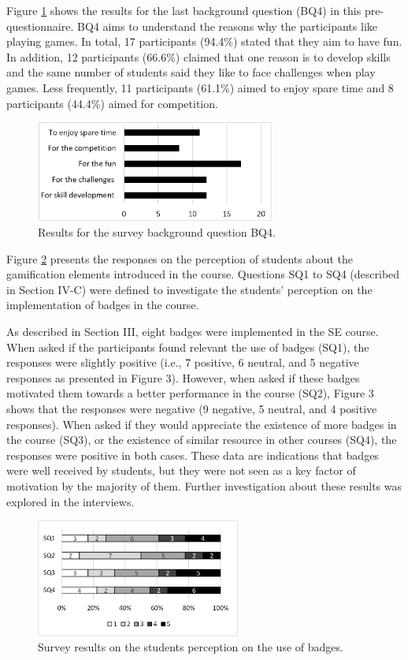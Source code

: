 Figure \ref{fig:gamificationbq4} shows the results for the last background question (BQ4) in this pre-questionnaire. BQ4 aims to understand the reasons why the participants like playing games. In total, 17 participants (94.4\%) stated that they aim to have fun. In addition, 12 participants (66.6\%) claimed that one reason is to develop skills and the same number of students said they like to face challenges when play games. Less frequently, 11 participants (61.1\%) aimed to enjoy spare time and 8 participants (44.4\%) aimed for competition.

\begin{figure}[!h]%
\centering
\includegraphics[width = 0.7\textwidth]{img/gamificationBQ4.png}
\caption{Results for the survey background question BQ4.}
\label{fig:gamificationbq4}
\end{figure}

Figure \ref{fig:gamificationsq14} presents the responses on the perception of students about the gamification elements introduced in the course. Questions SQ1 to SQ4 (described in Section IV-C) were defined to investigate the students’ perception on the implementation of badges in the course. 

As described in Section III, eight badges were implemented in the SE course. When asked if the participants found relevant the use of badges (SQ1), the responses were slightly positive (i.e., 7 positive, 6 neutral, and 5 negative responses as presented in Figure 3). However, when asked if these badges motivated them towards a better performance in the course (SQ2), Figure 3 shows that the responses were negative (9 negative, 5 neutral, and 4 positive responses). When asked if they would appreciate the existence of more badges in the course (SQ3), or the existence of similar resource in other courses (SQ4), the responses were positive in both cases. These data are indications that badges were well received by students, but they were not seen as a key factor of motivation by the majority of them. Further investigation about these results was explored in the interviews.

\begin{figure}[!h]%
\centering
\includegraphics[width = 0.6\textwidth]{img/gamificationSQ14.png}
\caption{Survey results on the students perception on the use of badges.}
\label{fig:gamificationsq14}
\end{figure}

